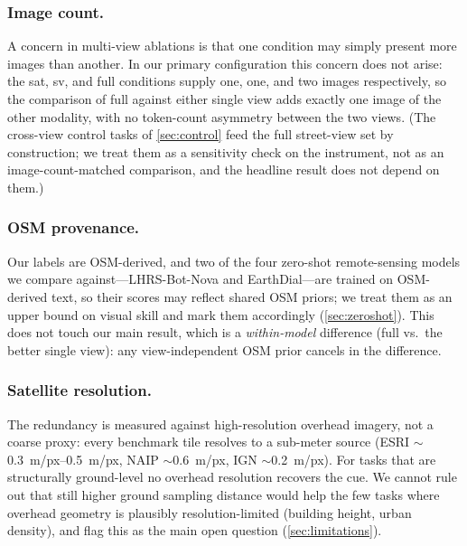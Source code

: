 \subsubsection{Image count.}
A concern in multi-view ablations is that one condition may simply present more
images than another. In our primary configuration this concern does not arise: the
\textsf{sat}, \textsf{sv}, and \textsf{full} conditions supply one, one, and two
images respectively, so the comparison of \textsf{full} against either single view
adds exactly one image of the other modality, with no token-count asymmetry between
the two views. (The cross-view control tasks of \cref{sec:control} feed the full
street-view set by construction; we treat them as a sensitivity check on the
instrument, not as an image-count-matched comparison, and the headline result does
not depend on them.)

\subsubsection{OSM provenance.}
Our labels are OSM-derived, and two of the four zero-shot remote-sensing models we
compare against---LHRS-Bot-Nova and EarthDial---are trained on OSM-derived text, so
their scores may reflect shared OSM priors; we treat them as an upper bound on
visual skill and mark them accordingly (\cref{sec:zeroshot}). This does not touch
our main result, which is a \emph{within-model} difference (\textsf{full} vs.\ the
better single view): any view-independent OSM prior cancels in the difference.

\subsubsection{Satellite resolution.}
The redundancy is measured against high-resolution overhead imagery, not a coarse
proxy: every benchmark tile resolves to a sub-meter source (ESRI
$\sim$\SIrange{0.3}{0.5}{m/px}, NAIP $\sim$\SI{0.6}{m/px}, IGN $\sim$\SI{0.2}{m/px}).
For tasks that are structurally ground-level no overhead resolution recovers the cue. We cannot rule out that still
higher ground sampling distance would help the few tasks where overhead geometry is
plausibly resolution-limited (building height, urban density), and flag this as the
main open question (\cref{sec:limitations}).
